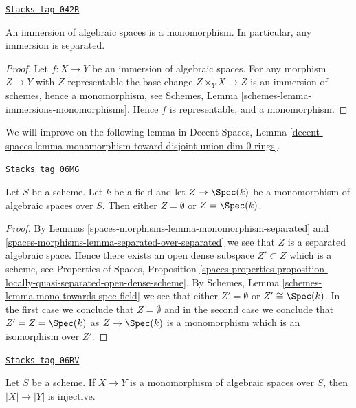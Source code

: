 \begin{lemma}
\label{spaces-morphisms-lemma-immersions-monomorphisms}
\href{https://stacks.math.columbia.edu/tag/042R}{\texttt{Stacks tag 042R}}

An immersion of algebraic spaces is a monomorphism.
In particular, any immersion is separated.
\end{lemma}

\begin{proof}
Let $f : X \to Y$ be an immersion of algebraic spaces.
For any morphism $Z \to Y$ with $Z$ representable the base
change $Z \times_Y X \to Z$ is an immersion of schemes, hence
a monomorphism, see
Schemes, Lemma \ref{schemes-lemma-immersions-monomorphisms}.
Hence $f$ is representable, and a monomorphism.
\end{proof}

We will improve on the following lemma in
Decent Spaces, Lemma
\ref{decent-spaces-lemma-monomorphism-toward-disjoint-union-dim-0-rings}.

\begin{lemma}
\label{spaces-morphisms-lemma-monomorphism-toward-field}
\href{https://stacks.math.columbia.edu/tag/06MG}{\texttt{Stacks tag 06MG}}

Let $S$ be a scheme. Let $k$ be a field and let $Z \to \Spec(k)$
be a monomorphism of algebraic spaces over $S$. Then either
$Z = \emptyset$ or $Z = \Spec(k)$.
\end{lemma}

\begin{proof}
By
Lemmas \ref{spaces-morphisms-lemma-monomorphism-separated} and
\ref{spaces-morphisms-lemma-separated-over-separated}
we see that $Z$ is a separated algebraic space. Hence there exists an
open dense subspace $Z' \subset Z$ which is a scheme, see
Properties of Spaces, Proposition
\ref{spaces-properties-proposition-locally-quasi-separated-open-dense-scheme}.
By
Schemes, Lemma \ref{schemes-lemma-mono-towards-spec-field}
we see that either $Z' = \emptyset$ or $Z' \cong \Spec(k)$.
In the first case we conclude that $Z = \emptyset$ and in the
second case we conclude that $Z' = Z = \Spec(k)$
as $Z \to \Spec(k)$ is a monomorphism which is an
isomorphism over $Z'$.
\end{proof}

\begin{lemma}
\label{spaces-morphisms-lemma-monomorphism-injective-points}
\href{https://stacks.math.columbia.edu/tag/06RV}{\texttt{Stacks tag 06RV}}

Let $S$ be a scheme. If $X \to Y$ is a monomorphism of algebraic spaces
over $S$, then $|X| \to |Y|$ is injective.
\end{lemma}

